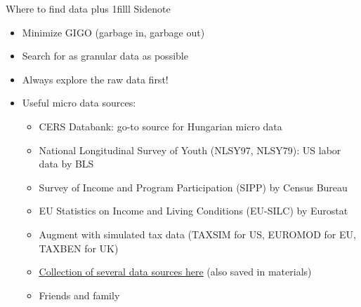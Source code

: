 \documentclass[aspectratio=169,compress,t,xcolor=table]{beamer}
\newcommand{\myhfill}[1]{\hskip0pt plus 1filll {\small #1}}
\begin{document}
{
\begin{frame}[fragile]{Where to find data \myhfill{Sidenote}}
  \begin{itemize}
    \vfill\item Minimize GIGO (garbage in, garbage out)
    \vfill\item Search for as granular data as possible
    \vfill\item Always explore the raw data first!
    \vfill\item Useful micro data sources:
    \begin{itemize}
      \addtolength{\baselineskip}{0.5em}
      \item CERS Databank: go-to source for Hungarian micro data
      \item National Longitudinal Survey of Youth (NLSY97, NLSY79): US labor data by BLS
      \item Survey of Income and Program Participation (SIPP) by Census Bureau
      \item EU Statistics on Income and Living Conditions (EU-SILC) by Eurostat
      \item Augment with simulated tax data (TAXSIM for US, EUROMOD for EU, TAXBEN for UK)
      \item \href{https://docs.google.com/spreadsheets/d/1xjw5Z0LLK4Fp-vrEK523uvMnSfxtJOb_5f_vKUrZJDg/edit#gid=0}{\color{MyStructure}\underline{Collection of several data sources here}} (also saved in materials)
      \item Friends and family
    \end{itemize}
  \end{itemize}
\end{frame}

}
\end{document}
